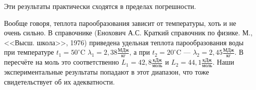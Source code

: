 \documentclass[12pt]{article}
\begin{document}
	Эти результаты практически сходятся в пределах погрешности.
	
	Вообще говоря, теплота парообразования зависит от температуры, хоть и не очень сильно. В справочнике (Енохович А.С. Краткий справочник по физике. М., <<Высш. школа>>, 1976) приведена удельная теплота парообразования воды при температуре $t_1=50^\circ \text{C}$ $\lambda_1=2{,}38 \frac{\text{МДж}}{\text{кг}}$, а при $t_2=20^\circ \text{C}$ --- $\lambda_2=2{,}45 \frac{\text{МДж}}{\text{кг}}$. В пересчёте на моль это соответственно $L_1= 42{,}8 \frac{\text{кДж}}{\text{моль}}$ и $L_2= 44{,}1 \frac{\text{кДж}}{\text{моль}}$. Наши экспериментальные результаты попадают в этот диапазон, что тоже свидетельствует об их адекватности.
	
\end{document}
